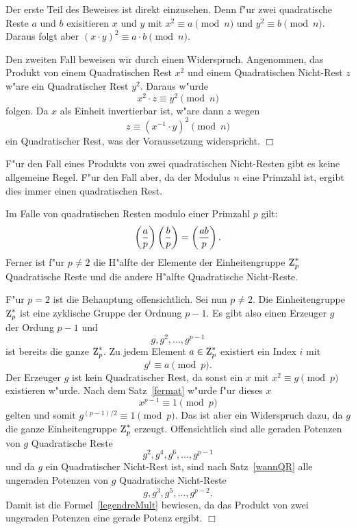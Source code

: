 \beweis 
Der erste Teil des Beweises ist direkt einzusehen. Denn f"ur zwei
quadratische Reste $a$ und $b$ exisitieren $x$ und $y$ mit $x^2 \equiv
a \pmod{n}$ und $y^2 \equiv b \pmod{n}$. Daraus folgt aber $(x\cdot
y)^2 \equiv a\cdot b \pmod{n}$.

Den zweiten Fall beweisen wir durch einen Widerspruch. Angenommen, das
Produkt von einem Quadratischen Rest $x^2$ und einem Quadratischen Nicht-Rest 
$z$ w"are ein Quadratischer Rest
$y^2$. Daraus w"urde
$$ x^2 \cdot z \equiv y^2 \pmod{n}$$
folgen. Da $x$ als Einheit invertierbar ist, w"are dann $z$ wegen
$$ z \equiv (x^{-1} \cdot y)^2 \pmod{n}$$
ein Quadratischer Rest, was der Voraussetzung widerspricht. \hfill $\Box$

F"ur den Fall eines Produkts von zwei quadratischen Nicht-Resten gibt
es keine allgemeine Regel. F"ur den Fall aber, da\3 der Modulus $n$
eine Primzahl ist, ergibt dies immer einen quadratischen Rest.

\begin{satz} \label{legmultiplikativ}
  Im Falle von quadratischen Resten modulo einer Primzahl $p$ gilt:
  \begin{equation}
    \left(\frac{a}{p}\right) \left(\frac{b}{p}\right) = \left(\frac{ab}{p}\right). \label{legendreMult}
  \end{equation}
  Ferner ist f"ur $p\ne 2$ die H"alfte der Elemente der Einheitengruppe 
  $\einheit{p}$ Quadratische Reste und die andere H"alfte Quadratische 
  Nicht-Reste.
\end{satz}

\beweis 
F"ur $p=2$ ist die Behauptung offensichtlich. Sei nun $p\ne 2$.  Die
Einheitengruppe $\einheit{p}$ ist eine zyklische Gruppe der Ordnung
$p-1$. Es gibt also einen Erzeuger $g$ der Ordung $p-1$ und
$$ g,g^2,\ldots,g^{p-1} $$ 
ist bereits die ganze $\einheit{p}$. Zu jedem Element
$a\in\einheit{p}$ existiert ein Index $i$ mit
$$ g^i \equiv a \pmod{p}. $$ Der Erzeuger $g$ ist kein Quadratischer
Rest, da sonst ein $x$ mit $x^2 \equiv g \pmod{p}$ existieren
w"urde. Nach dem Satz~\ref{fermat} w"urde f"ur dieses $x$
$$ x^{p-1} \equiv 1 \pmod{p} $$ gelten und somit $g^{(p-1)/2} \equiv 1
\pmod{p}$. Das ist aber ein Widerspruch dazu, da\3 $g$ die ganze
Einheitengruppe $\einheit{p}$ erzeugt.  Offensichtlich sind alle
geraden Potenzen von $g$ Quadratische Reste
$$ g^2,g^4,g^6,\ldots ,g^{p-1}$$
und da $g$ ein Quadratischer Nicht-Rest ist, sind nach Satz~\ref{wannQR}
alle ungeraden Potenzen von $g$ Quadratische Nicht-Reste
$$ g,g^3,g^5, \ldots ,g^{p-2}.$$ 
Damit ist die Formel~\ref{legendreMult} bewiesen, da das
Produkt von zwei ungeraden Potenzen eine gerade Potenz ergibt. 
\hfill $\Box$


